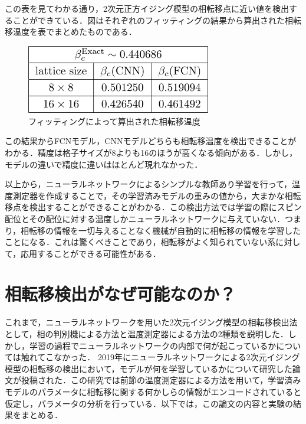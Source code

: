 \documentclass[a4paper,11pt]{jsreport}
\begin{document}
この表を見てわかる通り，2次元正方イジング模型の相転移点に近い値を検出することができている．図はそれぞれのフィッティングの結果から算出された相転移温度を表でまとめたものである．
\begin{figure}[H]
   \begin{center}
       \includegraphics[height=3cm]{image/温度測定器検出結果.png}
       \caption{フィッティングによって算出された相転移温度}
   \end{center}
\end{figure}
この結果からFCNモデル，CNNモデルどちらも相転移温度を検出できることがわかる．精度は格子サイズが8よりも16のほうが高くなる傾向がある．しかし，モデルの違いで精度に違いはほとんど現れなかった．\par
以上から，ニューラルネットワークによるシンプルな教師あり学習を行って，温度測定器を作成することで，その学習済みモデルの重みの値から，大まかな相転移点を検出することができることがわかる．この検出方法では学習の際にスピン配位とその配位に対する温度しかニューラルネットワークに与えていない．つまり，相転移の情報を一切与えることなく機械が自動的に相転移の情報を学習したことになる．これは驚くべきことであり，相転移がよく知られていない系に対して，応用することができる可能性がある．

\section{相転移検出がなぜ可能なのか？}
これまで，ニューラルネットワークを用いた2次元イジング模型の相転移検出法として，相の判別機による方法と温度測定器による方法の2種類を説明した．しかし，学習の過程でニューラルネットワークの内部で何が起こっているかについては触れてこなかった．
2019年にニューラルネットワークによる2次元イジング模型の相転移の検出において，モデルが何を学習しているかについて研究した論文が投稿された\cite{10.1093/ptep/ptz082}．この研究では前節の温度測定器による方法を用いて，学習済みモデルのパラメータに相転移に関する何かしらの情報がエンコードされていると仮定し，パラメータの分析を行っている．以下では，この論文の内容と実験の結果をまとめる．
\end{document}
